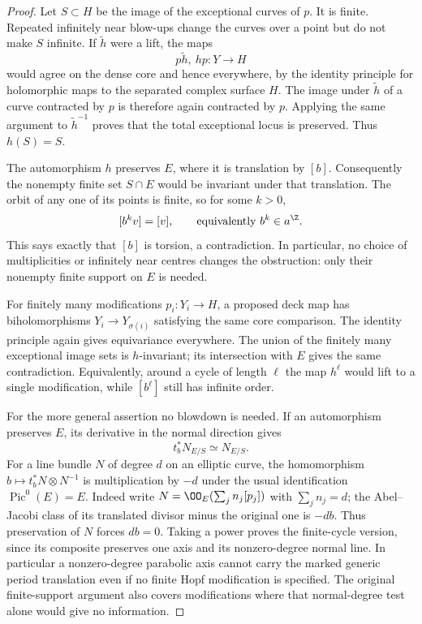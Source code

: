 \begin{proof}
Let $S\subset H$ be the image of the exceptional curves of $p$.
It is finite. Repeated infinitely near blow-ups change the curves
over a point but do not make $S$ infinite.
If $\widetilde h$ were a lift, the maps
\[
 p\widetilde h,\ hp:Y\longrightarrow H
\]
would agree on the dense core and hence everywhere, by the identity
principle for holomorphic maps to the separated complex surface $H$.
The image under $\widetilde h$ of a curve contracted by $p$ is
therefore again contracted by $p$. Applying the same argument to
$\widetilde h^{-1}$ proves that the total exceptional locus is
preserved. Thus $h(S)=S$.

The automorphism $h$ preserves $E$, where it is translation by
$[b]$. Consequently the nonempty finite set $S\cap E$ would be
invariant under that translation. The orbit of any one of its
points is finite, so for some $k>0$,
\[
 [b^k v]=[v],\qquad\text{equivalently } b^k\in a^\Z.
\]
This says exactly that $[b]$ is torsion, a contradiction.
In particular, no choice of multiplicities or infinitely near
centres changes the obstruction: only their nonempty finite
support on $E$ is needed.

For finitely many modifications $p_i:Y_i\to H$, a proposed deck
map has biholomorphisms
$Y_i\to Y_{\sigma(i)}$ satisfying the same core comparison.
The identity principle again gives equivariance everywhere.
The union of the finitely many exceptional image sets is
$h$-invariant; its intersection with $E$ gives the same contradiction.
Equivalently, around a cycle of length $\ell$ the map $h^\ell$
would lift to a single modification, while $[b^\ell]$ still has
infinite order.

For the more general assertion no blowdown is needed.
If an automorphism preserves $E$, its derivative in the normal
direction gives
\[
 t_b^*N_{E/S}\simeq N_{E/S}.
\]
For a line bundle $N$ of degree $d$ on an elliptic curve, the
homomorphism $b\mapsto t_b^*N\otimes N^{-1}$ is multiplication
by $-d$ under the usual identification $\operatorname{Pic}^0(E)=E$.
Indeed write $N=\OO_E(\sum_j n_j[p_j])$ with
$\sum_j n_j=d$; the Abel--Jacobi class of its translated divisor
minus the original one is $-d b$.
Thus preservation of $N$ forces $d b=0$.
Taking a power proves the finite-cycle version, since its composite
preserves one axis and its nonzero-degree normal line.
In particular a nonzero-degree parabolic axis cannot carry the
marked generic period translation even if no finite Hopf
modification is specified. The original finite-support argument
also covers modifications where that normal-degree test alone
would give no information.


\end{proof}
